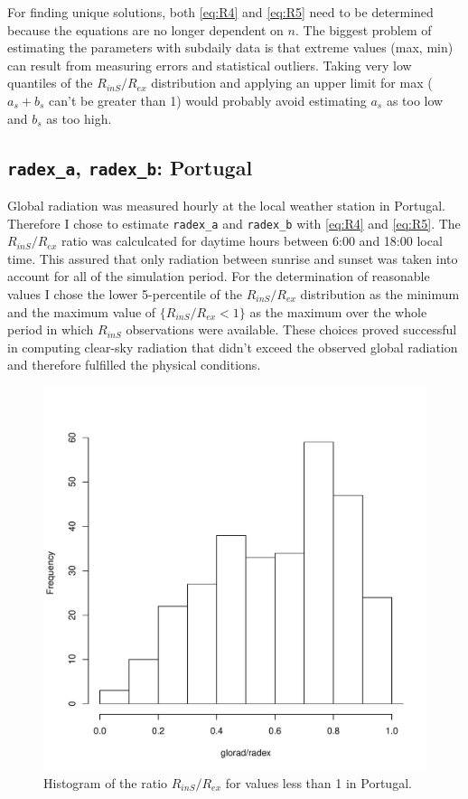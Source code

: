 \documentclass{scrreprt}
\begin{document}
For finding unique solutions, both \eqref{eq:R4} and \eqref{eq:R5} need to be determined because the equations are no longer dependent on $n$.
The biggest problem of estimating the parameters with subdaily data is that extreme values (max, min) can result from measuring errors and statistical outliers.
Taking very low quantiles of the $R_{inS}/R_{ex}$ distribution and applying an upper limit for max ($a_s + b_s$ can't be greater than 1) would probably avoid estimating $a_s$ as too low and $b_s$ as too high.

\subsection{\texttt{radex\_a}, \texttt{radex\_b}: Portugal} \label{ssec:parest_rad_radexportugal}

Global radiation was measured hourly at the local weather station in Portugal.
Therefore I chose to estimate \verb!radex_a! and \verb!radex_b! with \eqref{eq:R4} and \eqref{eq:R5}.
The $R_{inS}/R_{ex}$ ratio was calculcated for daytime hours between 6:00 and 18:00 local time.
This assured that only radiation between sunrise and sunset was taken into account for all of the simulation period.
For the determination of reasonable values I chose the lower 5-percentile of the $R_{inS}/R_{ex}$ distribution as the minimum and the maximum value of $\{R_{inS}/R_{ex} < 1\}$ as the maximum over the whole period in which $R_{inS}$ observations were available.
These choices proved successful in computing clear-sky radiation that didn't exceed the observed global radiation and therefore fulfilled the physical conditions.

\begin{figure}[ht]
  \centering
  \includegraphics[width=0.5\hsize]{./plot_radex1.pdf}
  \caption{Histogram of the ratio $R_{inS}/R_{ex}$ for values less than 1 in Portugal.}
  \label{fig:portugal_radex1}
\end{figure}
\end{document}
